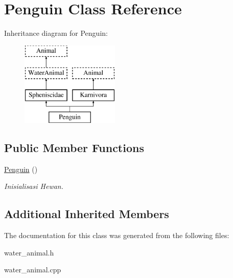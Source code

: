 \hypertarget{class_penguin}{}\section{Penguin Class Reference}
\label{class_penguin}
Inheritance diagram for Penguin\+:\begin{figure}[H]
\begin{center}
\leavevmode
\includegraphics[height=4.000000cm]{class_penguin}
\end{center}
\end{figure}
\subsection*{Public Member Functions}
\begin{DoxyCompactItemize}
\item 
\hyperlink{class_penguin_a215ac88a9d57ac01355e414c0527e862}{Penguin} ()\hypertarget{class_penguin_a215ac88a9d57ac01355e414c0527e862}{}\label{class_penguin_a215ac88a9d57ac01355e414c0527e862}

\begin{DoxyCompactList}\small\item\em Inisialisasi Hewan. \end{DoxyCompactList}\end{DoxyCompactItemize}
\subsection*{Additional Inherited Members}


The documentation for this class was generated from the following files\+:\begin{DoxyCompactItemize}
\item 
water\+\_\+animal.\+h\item 
water\+\_\+animal.\+cpp\end{DoxyCompactItemize}
